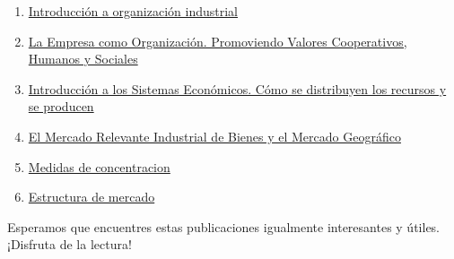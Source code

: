 \documentclass[
  a4paper,
]{article}
\begin{document}
\begin{enumerate}
\def\labelenumi{\arabic{enumi}.}
\item
  \href{../2023-06-12-introducion-organizacion-industrial/index.qmd}{Introducción
  a organización industrial}
\item
  \href{../2023-06-13-empresa-como-organizacion/index.qmd}{La Empresa
  como Organización. Promoviendo Valores Cooperativos, Humanos y
  Sociales}
\item
  \href{../2023-06-13-sistemas-economicos/index.qmd}{Introducción a los
  Sistemas Económicos. Cómo se distribuyen los recursos y se producen}
\item
  \href{../2023-06-15-mercado-relevante-oi-cap-2/index.qmd}{El Mercado
  Relevante Industrial de Bienes y el Mercado Geográfico}
\item
  \href{../2023-06-16-concentracion-poder-oi-cap3/index.qmd}{Medidas de
  concentracion}
\item
  \href{../2023-06-17-estructura-mercado-oi-cap4/index.qmd}{Estructura
  de mercado}
\end{enumerate}

Esperamos que encuentres estas publicaciones igualmente interesantes y
útiles. ¡Disfruta de la lectura!


\printbibliography
\end{document}
